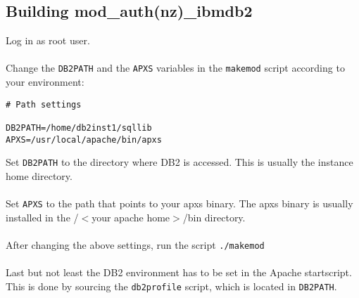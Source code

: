 \documentclass[11pt,letterpaper]{article}
\begin{document}
\subsection{Building mod\_auth(nz)\_ibmdb2}
Log in as root user.\\
\\
Change the {\tt DB2PATH} and the {\tt APXS} variables in the {\tt makemod} script according to your environment:
\begin{verbatim}
# Path settings

DB2PATH=/home/db2inst1/sqllib
APXS=/usr/local/apache/bin/apxs
\end{verbatim}
Set {\tt DB2PATH} to the directory where DB2 is accessed. This is usually the instance home directory.\\
\\
Set {\tt APXS} to the path that points to your apxs binary. The apxs binary is usually installed in the /$<$your apache home$>$/bin directory.\\
\\
After changing the above settings, run the script {\tt ./makemod}\\
\\
Last but not least the DB2 environment has to be set in the Apache startscript. This is done by sourcing the {\tt db2profile} script, which is located in {\tt DB2PATH}.\\
\end{document}
